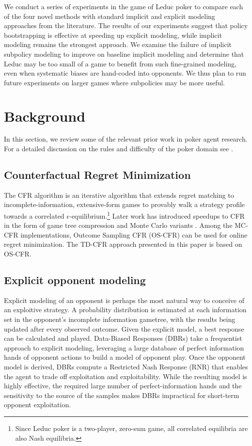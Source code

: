 \documentclass{aamas2013}
\begin{document}
We conduct a series of experiments in the game of Leduc poker to compare each of the four novel methods with standard implicit and explicit modeling approaches from the literature. The results of our experiments suggest that policy bootstrapping is effective at speeding up explicit modeling, while implicit modeling remains the strongest approach. We examine the failure of implicit subpolicy modeling to improve on baseline implicit modeling and determine that Leduc may be too small of a game to benefit from such fine-grained modeling, even when systematic biases are hand-coded into opponents. We thus plan to run future experiments on larger games where subpolicies may be more useful.


\section{Background}
In this section, we review some of the relevant prior work in poker agent research. For a detailed discussion on the rules and difficulty of the poker domain see \cite{billings2002challenge}.

    \subsection{Counterfactual Regret Minimization}
    The CFR algorithm \cite{cfr} is an iterative algorithm that extends regret matching \cite{regretmatching} to incomplete-information, extensive-form games to provably walk a strategy profile towards a correlated $\epsilon$-equilibrium.\footnote{Since Leduc poker is a two-player, zero-sum game, all correlated equilibria are also Nash equilibria.} Later work has introduced speedups to CFR in the form of game tree compression \cite{pcs} and Monte Carlo variants \cite{mccfr}. Among the MC-CFR implementations, Outcome Sampling CFR (OS-CFR) can be used for online regret minimization. The TD-CFR approach presented in this paper is based on OS-CFR.
    
    \subsection{Explicit opponent modeling}
    Explicit modeling of an opponent is perhaps the most natural way to conceive of an exploitive strategy. A probability distribution is estimated at each information set in the opponent's incomplete information gametree, with the results being updated after every observed outcome. Given the explicit model, a best response can be calculated and played. Data-Biased Responses (DBRs) \cite{dbr} take a frequentist approach to explicit modeling, leveraging a large database of perfect information hands of opponent actions to build a model of opponent play. Once the opponent model is derived, DBRs compute a Restricted Nash Response (RNR) \cite{rnr} that enables the agent to trade off exploitation and exploitability. While the resulting model is highly effective, the required large number of perfect-information hands and the sensitivity to the source of the samples makes DBRs impractical for short-term opponent exploitation.
\end{document}
